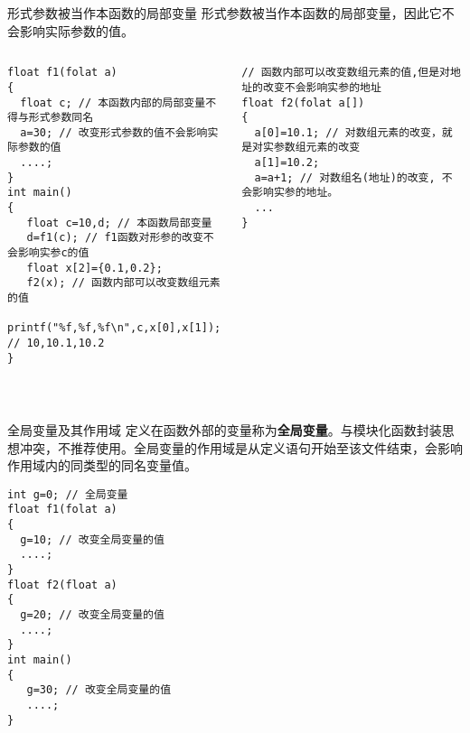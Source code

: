 \begin{frame}{形式参数被当作本函数的局部变量}
形式参数被当作本函数的局部变量，因此它不会影响实际参数的值。
\begin{columns}[T]
\begin{lstlisting}
float f1(folat a) 
{
  float c; // 本函数内部的局部变量不得与形式参数同名
  a=30; // 改变形式参数的值不会影响实际参数的值
  ....;
}
int main()
{
   float c=10,d; // 本函数局部变量
   d=f1(c); // f1函数对形参的改变不会影响实参c的值
   float x[2]={0.1,0.2}; 
   f2(x); // 函数内部可以改变数组元素的值
   printf("%f,%f,%f\n",c,x[0],x[1]); // 10,10.1,10.2  
}
\end{lstlisting}
\begin{lstlisting}[frame=leftline]
// 函数内部可以改变数组元素的值,但是对地址的改变不会影响实参的地址
float f2(folat a[]) 
{
  a[0]=10.1; // 对数组元素的改变，就是对实参数组元素的改变
  a[1]=10.2;
  a=a+1; // 对数组名(地址)的改变, 不会影响实参的地址。
  ...
}
\end{lstlisting}
\end{columns}
~\\
\end{frame}

\begin{frame}{全局变量及其作用域}
定义在函数外部的变量称为\textbf{全局变量}。与模块化函数封装思想冲突，不推荐使用。全局变量的作用域是从定义语句开始至该文件结束，会影响作用域内的同类型的同名变量值。 
\begin{lstlisting}
int g=0; // 全局变量
float f1(folat a) 
{
  g=10; // 改变全局变量的值
  ....;
}
float f2(float a)
{ 
  g=20; // 改变全局变量的值
  ....;
}
int main()
{
   g=30; // 改变全局变量的值
   ....;
}
\end{lstlisting}
\end{frame}




